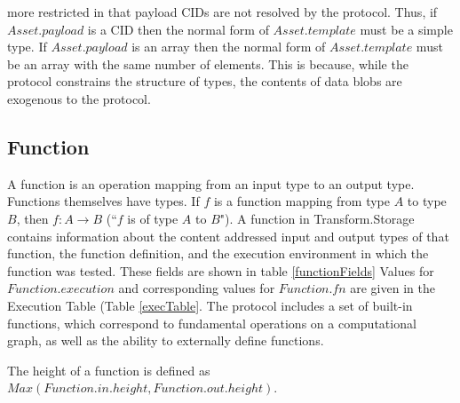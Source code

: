 \documentclass[9pt, oneside]{article}   	%
\begin{document}
\begin{multicols}{2}
\setlength{\parindent}{0 cm}

more restricted in that payload CIDs are not resolved by the protocol. Thus, if $Asset.payload$ is a CID then the normal form of $Asset.template$ must be a simple type. If $Asset.payload$ is an array then the normal form of $Asset.template$ must be an array with the same number of elements. This is because, while the protocol constrains the structure of types, the contents of data blobs are exogenous to the protocol.
\setlength{\parindent}{.5 cm}

\subsection{Function}\label{function}
A function is an operation mapping from an input type to an output type. Functions themselves have types. If $f$ is a function mapping from type $A$ to type $B$, then $f : A \rightarrow B$ (``$f$ is of type $A$ to $B$"). A function in Transform.Storage contains information about the content addressed input and output types of that function, the function definition, and the execution environment in which the function was tested. These fields are shown in table \ref{functionFields}
Values for $Function.execution$ and corresponding values for $Function.fn$ are given in the Execution Table (Table \ref{execTable}. The protocol includes a set of built-in functions, which correspond to fundamental operations on a computational graph, as well as the ability to externally define functions.

The height of a function is defined as $Max( Function.in.height, Function.out.height )$.




\end{multicols}
\end{document}
